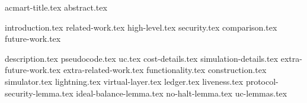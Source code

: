 \documentclass[sigconf]{acmart}
\begin{document}
\pagestyle{plain}
{acmart-title.tex}
{abstract.tex}
\maketitle


{introduction.tex}
{related-work.tex}
{high-level.tex}
{security.tex}
{comparison.tex}
{future-work.tex}

\newpage
\makeatletter%
%
  {\appendices}%
  {\appendix}%
\makeatother%
{description.tex}
{pseudocode.tex}
{uc.tex}
{cost-details.tex}
{simulation-details.tex}
{extra-future-work.tex}
{extra-related-work.tex}
{functionality.tex}
{construction.tex}
{simulator.tex}
{lightning.tex}
{virtual-layer.tex}
{ledger.tex}
{liveness.tex}
{protocol-security-lemma.tex}
{ideal-balance-lemma.tex}
{no-halt-lemma.tex}
{uc-lemmas.tex}
\end{document}
